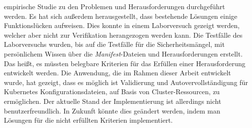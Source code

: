 empirische Studie zu den Problemen und Herausforderungen durchgeführt werden.
Es hat sich außerdem herausgestellt, dass bestehende Lösungen einige Funktionslücken aufweisen.
Dies konnte in einem Laborversuch gezeigt werden, welcher aber nicht zur Verifikation herangezogen werden kann.
Die Testfälle des Laborversuchs wurden, bis auf die Testfälle für die Sicherheitsmängel,
mit persönlichem Wissen über die \textit{Manifest}-Dateien und Herausforderungen erstellt.
Das heißt, es müssten belegbare Kriterien für das Erfüllen einer Herausforderung entwickelt werden.
Die Anwendung, die im Rahmen dieser Arbeit entwickelt wurde, hat gezeigt, dass es möglich ist
Validierung und Autovervollständigung für Kubernetes Konfigurationsdateien, auf Basis von Cluster-Ressourcen, zu ermöglichen.
Der aktuelle Stand der Implementierung ist allerdings nicht benutzerfreundlich.
In Zukunft könnte dies geändert werden, indem man Lösungen für die nicht erfüllten Kriterien implementiert.